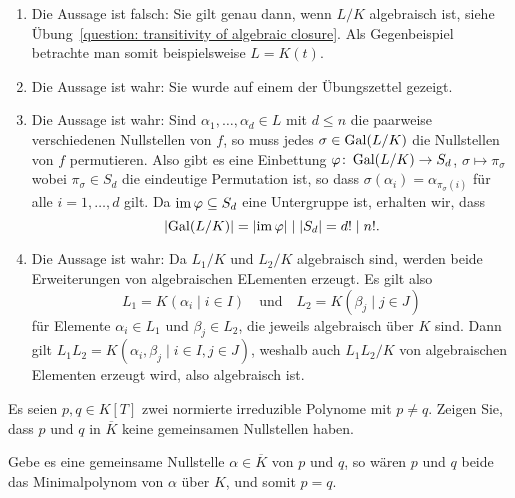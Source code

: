 \begin{solution}
\begin{enumerate}
    \item
      Die Aussage ist falsch:
      Sie gilt genau dann, wenn $L/K$ algebraisch ist, siehe Übung~\ref{question: transitivity of algebraic closure}.
      Als Gegenbeispiel betrachte man somit beispielsweise $L = K(t)$.
      
    \item
      Die Aussage ist wahr:
      Sie wurde auf einem der Übungszettel gezeigt.
      
    \item
      Die Aussage ist wahr:
      Sind $\alpha_1, \dotsc, \alpha_d \in L$ mit $d \leq n$ die paarweise verschiedenen Nullstellen von $f$, so muss jedes $\sigma \in \operatorname{Gal}(L/K)$ die Nullstellen von $f$ permutieren.
      Also gibt es eine Einbettung $\varphi \colon \operatorname{Gal}(L/K) \to S_d$, $\sigma \mapsto \pi_\sigma$ wobei $\pi_\sigma \in S_d$ die eindeutige Permutation ist, so dass $\sigma(\alpha_i) = \alpha_{\pi_\sigma(i)}$ für alle $i = 1, \dotsc, d$ gilt.
      Da $\operatorname{im} \varphi \subseteq S_d$ eine Untergruppe ist, erhalten wir, dass
      \[
              |{\operatorname{Gal}(L/K)}|
        =     |{\operatorname{im} \varphi}|
        \mid  |S_d|
        =     d!
        \mid  n!.
      \]
    
    \item
      Die Aussage ist wahr:
      Da $L_1/K$ und $L_2/K$ algebraisch sind, werden beide Erweiterungen von algebraischen ELementen erzeugt.
      Es gilt also
      \[
        L_1 = K(\alpha_i \mid i \in I)
        \quad\text{und}\quad
        L_2 = K(\beta_j \mid j \in J)
      \]
      für Elemente $\alpha_i \in L_1$ und $\beta_j \in L_2$, die jeweils algebraisch über $K$ sind.
      Dann gilt $L_1 L_2 = K(\alpha_i, \beta_j \mid i \in I, j \in J)$, weshalb auch $L_1 L_2/K$ von algebraischen Elementen erzeugt wird, also algebraisch ist.
  \end{enumerate}
\end{solution}


\begin{question}[subtitle = Gemeinsame Nullstellen irreduzibler Polynome]
  Es seien $p, q \in K[T]$ zwei normierte irreduzible Polynome mit $p \neq q$.
  Zeigen Sie, dass $p$ und $q$ in $\overline{K}$ keine gemeinsamen Nullstellen haben.
\end{question}


\begin{solution}
  Gebe es eine gemeinsame Nullstelle $\alpha \in \overline{K}$ von $p$ und $q$, so wären $p$ und $q$ beide das Minimalpolynom von $\alpha$ über $K$, und somit $p = q$.
\end{solution}


